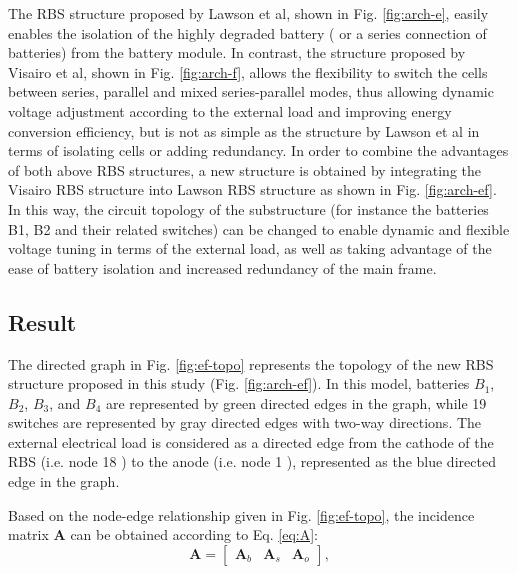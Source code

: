 \documentclass{article}
\begin{document}
The RBS structure proposed by Lawson et al\cite{lawsonSoftwareConfigurableBattery2012}, shown in Fig. \ref{fig:arch-e}, easily enables the isolation of the highly degraded battery ( or a series connection of batteries) from the battery module.
In contrast, the structure proposed by Visairo et al\cite{visairoReconfigurableBatteryPack2008}, shown in Fig. \ref{fig:arch-f}, allows the flexibility to switch the cells between series, parallel and mixed series-parallel modes, thus allowing dynamic voltage adjustment according to the external load and improving energy conversion efficiency, but is not as simple as the structure by Lawson et al in terms of isolating cells or adding redundancy. %
In order to combine the advantages of both above RBS structures, a new structure is obtained by integrating the Visairo RBS structure into Lawson RBS structure as shown in Fig. \ref{fig:arch-ef}.
In this way, the circuit topology of the substructure (for instance the batteries B1, B2 and their related switches) can be changed to enable dynamic and flexible voltage tuning in terms of the external load, as well as taking advantage of the ease of battery isolation and increased redundancy of the main frame.

\subsection{Result}

The directed graph in Fig. \ref{fig:ef-topo} represents the topology of the new RBS structure proposed in this study (Fig. \ref{fig:arch-ef}). 
In this model, batteries $B_1$, $B_2$, $B_3$, and $B_4$ are represented by green directed edges in the graph, while 19 switches are represented by gray directed edges with two-way directions. 
The external electrical load is considered as a directed edge from the cathode of the RBS (i.e. node 18 ) to the anode (i.e. node 1 ), represented as the blue directed edge in the graph.


Based on the node-edge relationship given in Fig. \ref{fig:ef-topo}, the incidence matrix $\bm{A}$ can be obtained according to Eq. \ref{eq:A}:
\begin{equation}
    \bm{A} = 
    \begin{bmatrix}
        \bm{A}_b & \bm{A}_s & \bm{A}_o
    \end{bmatrix},
\end{equation}
\end{document}

